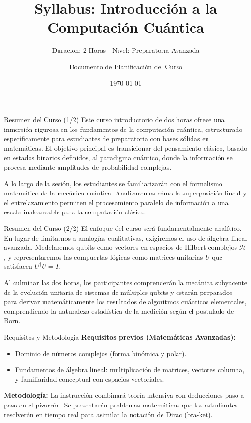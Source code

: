 \documentclass[aspectratio=169]{beamer}
\title{Syllabus: Introducción a la Computación Cuántica}
\subtitle{Duración: 2 Horas | Nivel: Preparatoria Avanzada}
\author{Documento de Planificación del Curso}
\date{\today}
\begin{document}
\maketitle

\begin{frame}{Resumen del Curso (1/2)}
Este curso introductorio de dos horas ofrece una inmersión rigurosa en los fundamentos de la computación cuántica, estructurado específicamente para estudiantes de preparatoria con bases sólidas en matemáticas. El objetivo principal es transicionar del pensamiento clásico, basado en estados binarios definidos, al paradigma cuántico, donde la información se procesa mediante amplitudes de probabilidad complejas.

A lo largo de la sesión, los estudiantes se familiarizarán con el formalismo matemático de la mecánica cuántica. Analizaremos cómo la superposición lineal y el entrelazamiento permiten el procesamiento paralelo de información a una escala inalcanzable para la computación clásica.
\end{frame}

\begin{frame}{Resumen del Curso (2/2)}
El enfoque del curso será fundamentalmente analítico. En lugar de limitarnos a analogías cualitativas, exigiremos el uso de álgebra lineal avanzada. Modelaremos qubits como vectores en espacios de Hilbert complejos $\mathcal{H}$, y representaremos las compuertas lógicas como matrices unitarias $U$ que satisfacen $U^\dagger U = I$. 

Al culminar las dos horas, los participantes comprenderán la mecánica subyacente de la evolución unitaria de sistemas de múltiples qubits y estarán preparados para derivar matemáticamente los resultados de algoritmos cuánticos elementales, comprendiendo la naturaleza estadística de la medición según el postulado de Born.
\end{frame}

\begin{frame}{Requisitos y Metodología}
\textbf{Requisitos previos (Matemáticas Avanzadas):}
\begin{itemize}
    \item Dominio de números complejos (forma binómica y polar).
    \item Fundamentos de álgebra lineal: multiplicación de matrices, vectores columna, y familiaridad conceptual con espacios vectoriales.
\end{itemize}
\vspace{0.5cm}
\textbf{Metodología:}
La instrucción combinará teoría intensiva con deducciones paso a paso en el pizarrón. Se presentarán problemas matemáticos que los estudiantes resolverán en tiempo real para asimilar la notación de Dirac (bra-ket).
\end{frame}
\end{document}
